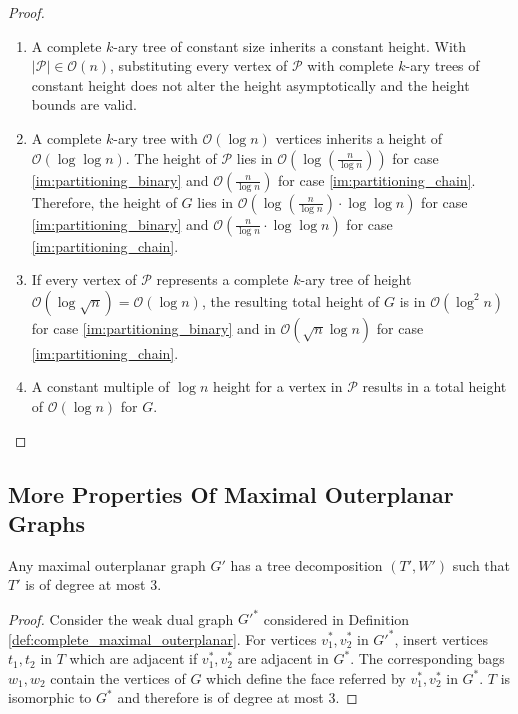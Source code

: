\begin{proof}
	\begin{enumerate}
		\item A complete $k$-ary tree of constant size inherits a constant height. With $|\mathcal{P}|\in \mathcal{O}(n)$, substituting every vertex of $\mathcal{P}$ with complete $k$-ary trees of constant height does not alter the height asymptotically and the height bounds are valid.
		\item A complete $k$-ary tree with $\mathcal{O}(\log n)$ vertices inherits a height of $\mathcal{O}(\log \log n)$. The height of $\mathcal{P}$ lies in $\mathcal{O}\left(\log\left(\frac{n}{\log n}\right)\right)$ for case \ref{im:partitioning_binary} and $\mathcal{O}\left(\frac{n}{\log n}\right)$ for case \ref{im:partitioning_chain}. Therefore, the height of $G$ lies in $\mathcal{O}\left(\log\left(\frac{n}{\log n}\right)\cdot \log \log n \right)$ for case \ref{im:partitioning_binary} and $\mathcal{O}\left(\frac{n}{\log n}\cdot \log \log n\right)$ for case \ref{im:partitioning_chain}.
		\item If every vertex of $\mathcal{P}$ represents a complete $k$-ary tree of height $\mathcal{O}(\log \sqrt{n}) = \mathcal{O}(\log n)$, the resulting total height of $G$ is in $\mathcal{O}(\log^2 n)$ for case \ref{im:partitioning_binary} and in $\mathcal{O}(\sqrt{n} \log n)$ for case \ref{im:partitioning_chain}. 
		\item A constant multiple of $\log n$ height for a vertex in $\mathcal{P}$ results in a total height of $\mathcal{O}(\log n)$ for $G$.
	\end{enumerate}
\end{proof}

\subsection{More Properties Of Maximal Outerplanar Graphs}

\begin{lemma}\label{l:outerplanar_tree_decomposition}
	Any maximal outerplanar graph $G'$ has a tree decomposition $(T',W')$ such that $T'$ is of degree at most 3.
\end{lemma}
\begin{proof}
	Consider the weak dual graph $G'^*$ considered in Definition \ref{def:complete_maximal_outerplanar}. For vertices $v_1^*,v_2^*$ in $G'^*$, insert vertices $t_1,t_2$ in $T$ which are adjacent if $v_1^*,v_2^*$ are adjacent in $G^*$. The corresponding bags $w_1, w_2$ contain the vertices of $G$ which define the face referred by $v_1^*,v_2^*$ in $G^*$. $T$ is isomorphic to $G^*$ and therefore is of degree at most 3.
\end{proof}


